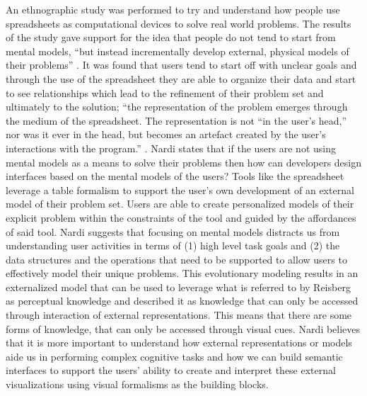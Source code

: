 \documentclass{sig-alternate}
\begin{document}
 
An ethnographic
study was performed to try and understand how people use spreadsheets as
computational devices to solve real world problems. The results of the study
gave support for the idea that people do not tend to start from mental models,
``but instead incrementally develop external, physical models of their
problems'' \cite{Nardi:BeyondModels}. It was found that users tend to start off
with unclear goals and through the use of the spreadsheet they are able to
organize their data and start to see relationships which lead to the refinement
of their problem set and ultimately to the solution; ``the representation of the
problem emerges through the medium of the spreadsheet. The representation is not
``in the user's head,'' nor was it ever in the head, but becomes an artefact
created by the user's interactions with the program.''
\cite{Nardi:BeyondModels}. Nardi states that if the users are not using mental
models as a  means to solve their problems then how can developers design
interfaces based on the mental models of the users? Tools like the spreadsheet
leverage a table formalism to support the user's own development of an external
model of their problem set. Users are able to create personalized models of
their explicit problem within the constraints of the tool and guided by the
affordances of said tool. Nardi suggests that focusing on mental models
distracts us from understanding user activities in terms of (1) high level task
goals and (2) the data structures and  the operations that need to be supported
to allow users to effectively model their unique problems. This evolutionary
modeling results in an externalized model that can be used to leverage what is referred to by Reisberg \cite{Reisberg:ExternalRepresentations} as perceptual knowledge and
described it as knowledge that can only be accessed  through interaction of
external representations. This means that there are some forms of knowledge,
that can only be accessed through visual cues. Nardi believes that it is more
important to understand how external representations or models aide us in performing complex
cognitive tasks and how we can build semantic interfaces to support the users'
ability to create and interpret these external visualizations using visual
formalisms as the building blocks.
 
\end{document}
